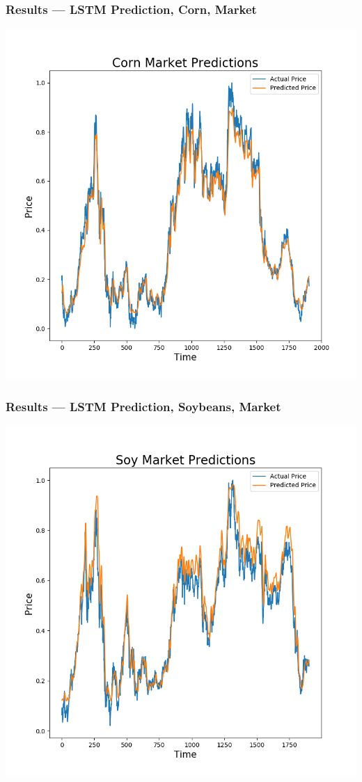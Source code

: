 \documentclass{beamer}
\begin{document}
\begin{frame}
\frametitle{Results --- LSTM Prediction, Corn, Market}
\begin{center}
\includegraphics[scale=.4]{images/CornMarket}
\end{center}
\end{frame}


\begin{frame}
\frametitle{Results --- LSTM Prediction, Soybeans, Market}
\begin{center}
\includegraphics[scale=.4]{images/SoyMarket}
\end{center}
\end{frame}
\end{document}
